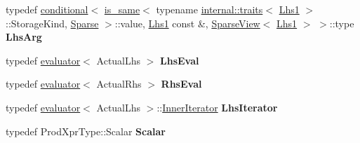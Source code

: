 \begin{DoxyCompactItemize}
typedef \mbox{\hyperlink{struct_eigen_1_1internal_1_1conditional}{conditional}}$<$ \mbox{\hyperlink{struct_eigen_1_1internal_1_1is__same}{is\+\_\+same}}$<$ typename \mbox{\hyperlink{struct_eigen_1_1internal_1_1traits}{internal\+::traits}}$<$ \mbox{\hyperlink{struct_eigen_1_1internal_1_1true__type}{Lhs1}} $>$\+::Storage\+Kind, \mbox{\hyperlink{struct_eigen_1_1_sparse}{Sparse}} $>$\+::value, \mbox{\hyperlink{struct_eigen_1_1internal_1_1true__type}{Lhs1}} const  \&, \mbox{\hyperlink{class_eigen_1_1_sparse_view}{Sparse\+View}}$<$ \mbox{\hyperlink{struct_eigen_1_1internal_1_1true__type}{Lhs1}} $>$ $>$\+::type {\bfseries Lhs\+Arg}
\item 
\mbox{\label{struct_eigen_1_1internal_1_1sparse__dense__outer__product__evaluator_ae920f1300917449afe084a52eedf683b}} 
typedef \mbox{\hyperlink{struct_eigen_1_1internal_1_1evaluator}{evaluator}}$<$ Actual\+Lhs $>$ {\bfseries Lhs\+Eval}
\item 
\mbox{\label{struct_eigen_1_1internal_1_1sparse__dense__outer__product__evaluator_a9579f6d11c3068bfb1b756614e3db673}} 
typedef \mbox{\hyperlink{struct_eigen_1_1internal_1_1evaluator}{evaluator}}$<$ Actual\+Rhs $>$ {\bfseries Rhs\+Eval}
\item 
\mbox{\label{struct_eigen_1_1internal_1_1sparse__dense__outer__product__evaluator_ac7db1d77e0e034402f9ac8ad50505110}} 
typedef \mbox{\hyperlink{struct_eigen_1_1internal_1_1evaluator}{evaluator}}$<$ Actual\+Lhs $>$\+::\mbox{\hyperlink{class_eigen_1_1internal_1_1sparse__dense__outer__product__evaluator_1_1_inner_iterator}{Inner\+Iterator}} {\bfseries Lhs\+Iterator}
\item 
\mbox{\label{struct_eigen_1_1internal_1_1sparse__dense__outer__product__evaluator_a3e2f6b63bc48b7188e2107bab123274e}} 
typedef Prod\+Xpr\+Type\+::\+Scalar {\bfseries Scalar}
\end{DoxyCompactItemize}
